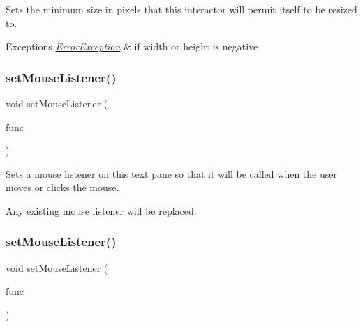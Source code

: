 Sets the minimum size in pixels that this interactor will permit itself to be resized to. 


\begin{DoxyExceptions}{Exceptions}
{\em \mbox{\hyperlink{classErrorException}{Error\+Exception}}} & if width or height is negative \\
\hline
\end{DoxyExceptions}
\mbox{\label{classGBrowserPane_a37d8dbc943f59920f705b0104f60bde2}} 
\subsubsection{\texorpdfstring{set\+Mouse\+Listener()}{setMouseListener()}\hspace{0.1cm}{\footnotesize\ttfamily [1/2]}}
{\footnotesize\ttfamily void set\+Mouse\+Listener (\begin{DoxyParamCaption}\item[{G\+Event\+Listener}]{func }\end{DoxyParamCaption})\hspace{0.3cm}{\ttfamily [virtual]}}



Sets a mouse listener on this text pane so that it will be called when the user moves or clicks the mouse. 

Any existing mouse listener will be replaced. \mbox{\label{classGBrowserPane_aea7f647ea62d59f71b5fad6aa65eeaf9}} 
\subsubsection{\texorpdfstring{set\+Mouse\+Listener()}{setMouseListener()}\hspace{0.1cm}{\footnotesize\ttfamily [2/2]}}
{\footnotesize\ttfamily void set\+Mouse\+Listener (\begin{DoxyParamCaption}\item[{G\+Event\+Listener\+Void}]{func }\end{DoxyParamCaption})\hspace{0.3cm}{\ttfamily [virtual]}}



